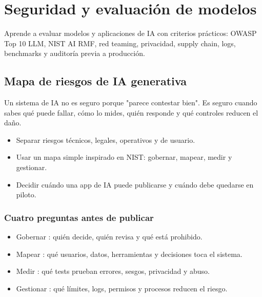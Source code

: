 \documentclass[11pt,a4paper]{book}
\begin{document}
\part{Seguridad y evaluación de modelos}
Aprende a evaluar modelos y aplicaciones de IA con criterios prácticos: OWASP Top 10 LLM, NIST AI RMF, red teaming, privacidad, supply chain, logs, benchmarks y auditoría previa a producción.

\chapter{Mapa de riesgos de IA generativa}
Un sistema de IA no es seguro porque "parece contestar bien". Es seguro cuando sabes qué puede fallar, cómo lo mides, quién responde y qué controles reducen el daño.

\begin{itemize}\item Separar riesgos técnicos, legales, operativos y de usuario.\end{itemize}
\begin{itemize}\item Usar un mapa simple inspirado en NIST: gobernar, mapear, medir y gestionar.\end{itemize}
\begin{itemize}\item Decidir cuándo una app de IA puede publicarse y cuándo debe quedarse en piloto.\end{itemize}
\section{Cuatro preguntas antes de publicar}
\begin{itemize}\item Gobernar : quién decide, quién revisa y qué está prohibido.\end{itemize}
\begin{itemize}\item Mapear : qué usuarios, datos, herramientas y decisiones toca el sistema.\end{itemize}
\begin{itemize}\item Medir : qué tests prueban errores, sesgos, privacidad y abuso.\end{itemize}
\begin{itemize}\item Gestionar : qué límites, logs, permisos y procesos reducen el riesgo.\end{itemize}
\end{document}
